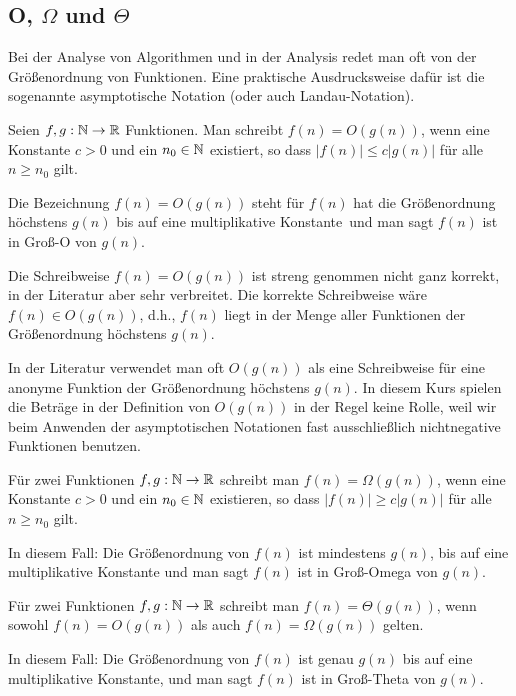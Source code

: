 \subsection{O, $\Omega$ und $\Theta$}

\begin{bem}
Bei der Analyse von Algorithmen und in der Analysis redet man oft von der Größenordnung von Funktionen. Eine praktische Ausdrucksweise dafür ist die sogenannte asymptotische Notation (oder auch Landau-Notation).
\end{bem} 

\begin{defn}[$O$-Notation]  
Seien $f, g: \mathbb{N} \to \mathbb{R}$ Funktionen. 
Man schreibt $f(n) = O(g(n))$, wenn eine Konstante $c>0$ und ein $n_0 \in \mathbb{N}$ existiert, so dass $|f(n)| \le c |g(n)|$ für alle $n \ge n_0$ gilt. 
\end{defn} 

\begin{bem} 
Die Bezeichnung $f(n)=O(g(n))$ steht für \glqq $f(n)$ hat die Größenordnung höchstens $g(n)$ bis auf eine multiplikative Konstante\grqq\ und man sagt \glqq$f(n)$ ist in Groß-O von $g(n)$\grqq.

Die Schreibweise $f(n) = O(g(n))$ ist streng genommen nicht ganz korrekt, in der Literatur aber sehr verbreitet. Die korrekte Schreibweise wäre $f(n) \in O(g(n))$, d.h., $f(n)$ liegt in der Menge aller Funktionen der Größenordnung höchstens $g(n)$.

In der Literatur verwendet man oft $O(g(n))$ als eine Schreibweise für eine anonyme Funktion der Größenordnung höchstens $g(n)$. In diesem Kurs spielen die Beträge in der Definition von $O(g(n))$ in der Regel keine Rolle, weil wir beim Anwenden der asymptotischen Notationen fast ausschließlich nichtnegative Funktionen benutzen. 
\end{bem} 

\begin{defn} 
Für zwei Funktionen $f, g: \mathbb{N} \to \mathbb{R}$ schreibt man $f(n) = \Omega(g(n))$, wenn eine Konstante $c>0$ und ein $n_0 \in \mathbb{N}$ existieren, so dass $|f(n)| \ge c |g(n)|$ für alle $n \ge n_0$ gilt.

In diesem Fall: Die Größenordnung von $f(n)$ ist mindestens $g(n)$, bis auf eine multiplikative Konstante und man sagt \glqq$f(n)$ ist in Groß-Omega von $g(n)$\grqq. 
\end{defn} 

\begin{defn} 
Für zwei Funktionen $f, g: \mathbb{N} \to \mathbb{R}$ schreibt man $f(n) = \Theta(g(n))$, wenn sowohl $f(n) = O(g(n))$ als auch $f(n) = \Omega(g(n))$ gelten.

In diesem Fall: Die Größenordnung von $f(n)$ ist genau $g(n)$ bis auf eine multiplikative Konstante, und man sagt \glqq$f(n)$ ist in Groß-Theta von $g(n)$\grqq.
\end{defn} 


